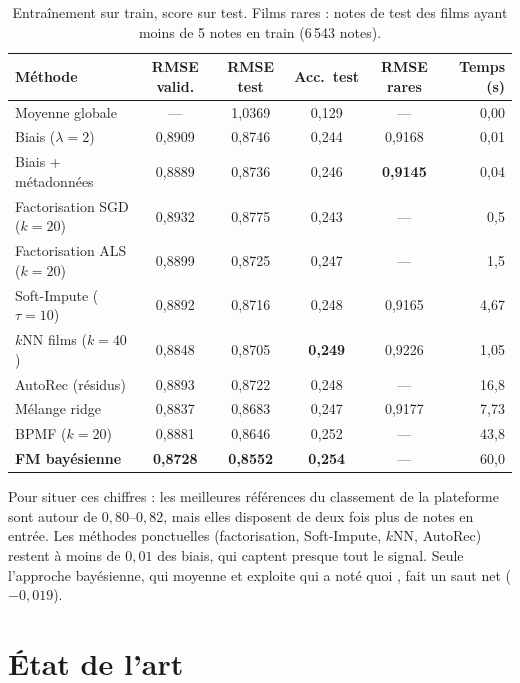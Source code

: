 \documentclass[11pt,a4paper]{article}
\begin{document}
\begin{table}[H]
\centering
\small
\setlength{\tabcolsep}{4pt}
\begin{tabular}{@{}lccccr@{}}
\toprule
\textbf{Méthode} & \textbf{RMSE valid.} & \textbf{RMSE test} & \textbf{Acc.\ test}
  & \textbf{RMSE rares} & \textbf{Temps (s)} \\
\midrule
Moyenne globale        & ---    & 1,0369 & 0,129 & ---    & 0,00 \\
Biais ($\lambda=2$)    & 0,8909 & 0,8746 & 0,244 & 0,9168 & 0,01 \\
Biais + métadonnées    & 0,8889 & 0,8736 & 0,246 & \textbf{0,9145} & 0,04 \\
Factorisation SGD ($k=20$) & 0,8932 & 0,8775 & 0,243 & ---    & 0,5 \\
Factorisation ALS ($k=20$) & 0,8899 & 0,8725 & 0,247 & ---    & 1,5 \\
Soft-Impute ($\tau=10$) & 0,8892 & 0,8716 & 0,248 & 0,9165 & 4,67 \\
$k$NN films ($k=40$)   & 0,8848 & 0,8705 & \textbf{0,249} & 0,9226 & 1,05 \\
AutoRec (résidus)      & 0,8893 & 0,8722 & 0,248 & ---    & 16,8 \\
Mélange ridge          & 0,8837 & 0,8683 & 0,247 & 0,9177 & 7,73 \\
BPMF ($k=20$)          & 0,8881 & 0,8646 & 0,252 & ---    & 43,8 \\
\midrule
\textbf{FM bayésienne} & \textbf{0,8728} & \textbf{0,8552} & \textbf{0,254} & --- & 60,0 \\
\bottomrule
\end{tabular}
\caption{Entraînement sur train, score sur test. \og Films rares \fg{} : notes de
test des films ayant moins de 5 notes en train (6\,543 notes).}
\label{tab:res}
\end{table}

Pour situer ces chiffres : les meilleures références du classement de la
plateforme sont autour de $0{,}80$--$0{,}82$, mais elles disposent de deux fois
plus de notes en entrée. Les méthodes \og ponctuelles \fg{} (factorisation,
Soft-Impute, $k$NN, AutoRec) restent à moins de $0{,}01$ des biais, qui captent
presque tout le signal. Seule l'approche bayésienne, qui moyenne et exploite
\og qui a noté quoi \fg{}, fait un saut net ($-0{,}019$).

\section{État de l'art}
\label{sec:sota}
\end{document}
